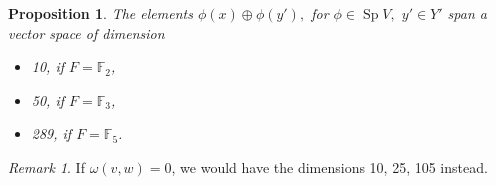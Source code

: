 \documentclass{amsart}
\DeclareMathOperator{\Sp}{Sp}
\DeclareMathOperator{\Sym}{Sym}
\newcommand{\Z}{\mathbb{Z}}
\theoremstyle{plain}
\newtheorem{proposition}[theorem]{Proposition}
\theoremstyle{definition}
\theoremstyle{remark}
\newtheorem{remark}[theorem]{Remark}
\begin{document}
\begin{proposition}
The elements $\phi(x)\oplus \phi(y'),$ for $\phi \in \Sp V,$ $y' \in Y'$ span a vector space of dimension
\begin{itemize}
\item 10, if $F=\mathbb F_2$,
\item 50, if $F=\mathbb F_3$,
\item 289, if $F=\mathbb F_5$.
\end{itemize}
\end{proposition}
\begin{remark}
If $\omega(v,w)=0$, we would have the dimensions 10, 25, 105 instead.
\end{remark}



\end{document}

